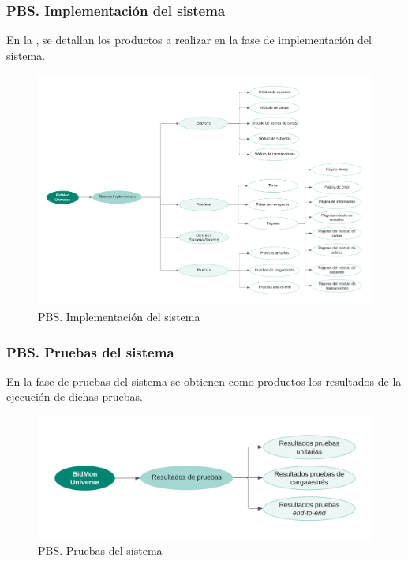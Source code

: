\subsubsection{PBS. Implementación del sistema}
En la , se detallan los productos a realizar en la fase de implementación del sistema.
\begin{figure}[H]
    \hypertarget{fig:5_PBS-Implementación-Sistema}{}
    \centering
    \includegraphics[width=0.9\linewidth]{figures/5-PBS/5_PBS-Implementacion.png}
    \caption{PBS. Implementación del sistema}
    \label{fig:5_PBS-Implementación-Sistema}
\end{figure}

\subsubsection{PBS. Pruebas del sistema}
En la fase de pruebas del sistema se obtienen como productos los resultados de la ejecución de dichas pruebas.
\begin{figure}[H]
    \hypertarget{fig:5_PBS-Pruebas-Sistema}{}
    \centering
    \includegraphics[width=0.7\linewidth]{figures/5-PBS/5_PBS-Pruebas.png}
    \caption{PBS. Pruebas del sistema}
    \label{fig:5_PBS-Pruebas-Sistema}
\end{figure}

